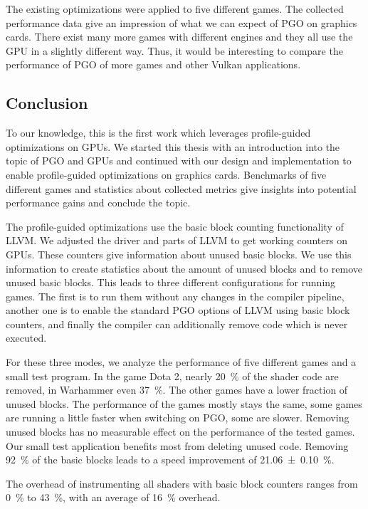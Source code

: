 The existing optimizations were applied to five different games.
The collected performance data give an impression of what we can expect of PGO on graphics cards.
There exist many more games with different engines and they all use the GPU in a slightly different way.
Thus, it would be interesting to compare the performance of PGO of more games and other Vulkan applications.

\subsection{Conclusion}
\label{sub:conclusion}
To our knowledge, this is the first work which leverages profile-guided optimizations on GPUs.
We started this thesis with an introduction into the topic of PGO and GPUs and continued with our design and implementation to enable profile-guided optimizations on graphics cards.
Benchmarks of five different games and statistics about collected metrics give insights into potential performance gains and conclude the topic.

The profile-guided optimizations use the basic block counting functionality of LLVM. We adjusted the driver and parts of LLVM to get working counters on GPUs.
These counters give information about unused basic blocks.
We use this information to create statistics about the amount of unused blocks and to remove unused basic blocks.
This leads to three different configurations for running games.
The first is to run them without any changes in the compiler pipeline, another one is to enable the standard PGO options of LLVM using basic block counters, and finally the compiler can additionally remove code which is never executed.

For these three modes, we analyze the performance of five different games and a small test program.
In the game Dota 2, nearly \SI{20}{\percent} of the shader code are removed, in Warhammer even \SI{37}{\percent}.
The other games have a lower fraction of unused blocks.
The performance of the games mostly stays the same, some games are running a little faster when switching on PGO, some are slower.
Removing unused blocks has no measurable effect on the performance of the tested games.
Our small test application benefits most from deleting unused code.
Removing \SI{92}{\percent} of the basic blocks leads to a speed improvement of \SI{21.06 \pm 0.10}{\percent}.

The overhead of instrumenting all shaders with basic block counters ranges from \SI{0}{\percent} to \SI{43}{\percent}, with an average of \SI{16}{\percent} overhead.

